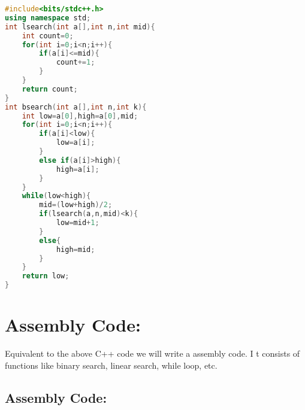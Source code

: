\documentclass[a4paper,10pt]{article} %
\begin{document}

\begin{codebox}
    
\begin{lstlisting}[language=C++]
#include<bits/stdc++.h>
using namespace std;
int lsearch(int a[],int n,int mid){
	int count=0;
	for(int i=0;i<n;i++){
		if(a[i]<=mid){
			count+=1;
		}
	}
	return count;
}
int bsearch(int a[],int n,int k){
	int low=a[0],high=a[0],mid;
	for(int i=0;i<n;i++){
		if(a[i]<low){
			low=a[i];
		}
		else if(a[i]>high){
			high=a[i];
		}
	}
	while(low<high){
		mid=(low+high)/2;
		if(lsearch(a,n,mid)<k){
			low=mid+1;
		}
		else{
			high=mid;
		}
	}
	return low;
}
\end{lstlisting} 
\end{codebox}

\section*{\huge{\textbf{Assembly Code:}}}

Equivalent to the above C++ code we will write a assembly code. I t consists of functions like binary search, linear search, while loop, etc.

\subsection*{\large{\textbf{Assembly Code:}}}
\end{document}
